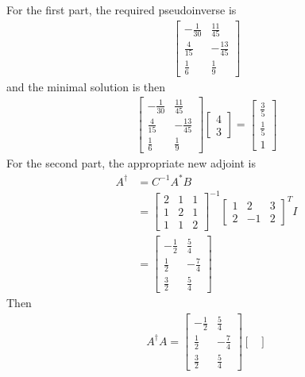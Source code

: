 \begin{Answer}
For the first part, the required pseudoinverse is
\begin{align*}
\begin{bmatrix}
-\frac{1}{30} & \frac{11}{45} \\
\frac{4}{15} & -\frac{13}{45} \\
\frac{1}{6} & \frac{1}{9}
\end{bmatrix}
\end{align*}
and the minimal solution is then
\begin{align*}
\begin{bmatrix}
-\frac{1}{30} & \frac{11}{45} \\
\frac{4}{15} & -\frac{13}{45} \\
\frac{1}{6} & \frac{1}{9}
\end{bmatrix} 
\begin{bmatrix}
4 \\
3
\end{bmatrix}
=
\begin{bmatrix}
\frac{3}{5}\\ 
\frac{1}{5}\\ 
1
\end{bmatrix}
\end{align*}
For the second part, the appropriate new adjoint is
\begin{align*}
A^\dag &= C^{-1} A^* B \\
&= \begin{bmatrix}
2 & 1 & 1 \\
1 & 2 & 1 \\
1 & 1 & 2
\end{bmatrix}^{-1} \begin{bmatrix}
1 & 2 & 3 \\
2 & -1 & 2
\end{bmatrix}^T
I \\
&= 
\begin{bmatrix}
-\frac{1}{2}&\frac{5}{4}\\ 
\frac{1}{2}&-\frac{7}{4}\\ 
\frac{3}{2}&\frac{5}{4}
\end{bmatrix}
\end{align*}
Then
\begin{align*}
A^\dag A = 
\begin{bmatrix}
-\frac{1}{2}&\frac{5}{4}\\ 
\frac{1}{2}&-\frac{7}{4}\\ 
\frac{3}{2}&\frac{5}{4}
\end{bmatrix}
\begin{bmatrix}

\end{bmatrix}
\end{align*}
\end{Answer}
